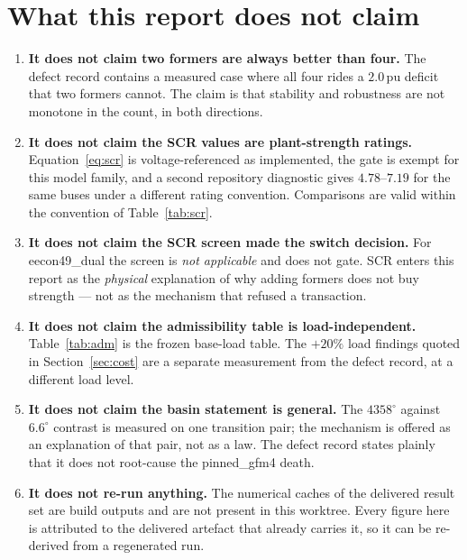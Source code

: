 \documentclass[12pt,a4paper]{article}
\theoremstyle{remark}
\newcommand{\pu}{\,\mathrm{pu}}
\newcommand{\code}[1]{{\ttfamily\small\hyphenchar\font=-1 #1}}
\begin{document}
\section{What this report does not claim}\label{sec:notclaimed}

\begin{enumerate}[leftmargin=1.7em,itemsep=2.5pt]
\item \textbf{It does not claim two formers are always better than four.} The
      defect record contains a measured case where all four rides a $2.0\pu$
      deficit that two formers cannot. The claim is that stability and
      robustness are not monotone in the count, in both directions.
\item \textbf{It does not claim the SCR values are plant-strength ratings.}
      Equation~\eqref{eq:scr} is voltage-referenced as implemented, the gate is
      exempt for this model family, and a second repository diagnostic gives
      $4.78$--$7.19$ for the same buses under a different rating convention.
      Comparisons are valid within the convention of Table~\ref{tab:scr}.
\item \textbf{It does not claim the SCR screen made the switch decision.} For
      \code{eecon49\_dual} the screen is \emph{not applicable} and does not gate.
      SCR enters this report as the \emph{physical} explanation of why adding
      formers does not buy strength --- not as the mechanism that refused a
      transaction.
\item \textbf{It does not claim the admissibility table is load-independent.}
      Table~\ref{tab:adm} is the frozen base-load table. The $+20\%$ load
      findings quoted in Section~\ref{sec:cost} are a separate measurement from
      the defect record, at a different load level.
\item \textbf{It does not claim the basin statement is general.} The
      $4358^{\circ}$ against $6.6^{\circ}$ contrast is measured on one transition
      pair; the mechanism is offered as an explanation of that pair, not as a
      law. The defect record states plainly that it does not root-cause the
      \code{pinned\_gfm4} death.
\item \textbf{It does not re-run anything.} The numerical caches of the
      delivered result set are build outputs and are not present in this
      worktree. Every figure here is attributed to the delivered artefact that
      already carries it, so it can be re-derived from a regenerated run.
\end{enumerate}
\end{document}
